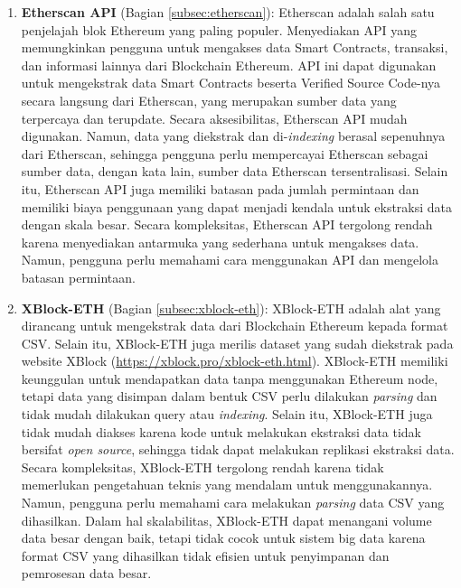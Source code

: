 \begin{enumerate}
	\item \textbf{Etherscan API} \parencite{etherscan2024} (Bagian \ref{subsec:etherscan}): Etherscan adalah salah satu penjelajah blok Ethereum yang paling populer. Menyediakan API yang memungkinkan pengguna untuk mengakses data Smart Contracts, transaksi, dan informasi lainnya dari Blockchain Ethereum. API ini dapat digunakan untuk mengekstrak data Smart Contracts beserta Verified Source Code-nya secara langsung dari Etherscan, yang merupakan sumber data yang terpercaya dan terupdate. Secara aksesibilitas, Etherscan API mudah digunakan. Namun, data yang diekstrak dan di-\textit{indexing} berasal sepenuhnya dari Etherscan, sehingga pengguna perlu mempercayai Etherscan sebagai sumber data, dengan kata lain, sumber data Etherscan tersentralisasi. Selain itu, Etherscan API juga memiliki batasan pada jumlah permintaan dan memiliki biaya penggunaan yang dapat menjadi kendala untuk ekstraksi data dengan skala besar. Secara kompleksitas, Etherscan API tergolong rendah karena menyediakan antarmuka yang sederhana untuk mengakses data. Namun, pengguna perlu memahami cara menggunakan API dan mengelola batasan permintaan.

	\item \textbf{XBlock-ETH} \parencite{zheng2020xblock} (Bagian \ref{subsec:xblock-eth}): XBlock-ETH adalah alat yang dirancang untuk mengekstrak data dari Blockchain Ethereum kepada format CSV. Selain itu, XBlock-ETH juga merilis dataset yang sudah diekstrak pada website XBlock (\url{https://xblock.pro/xblock-eth.html}). XBlock-ETH memiliki keunggulan untuk mendapatkan data tanpa menggunakan Ethereum node, tetapi data yang disimpan dalam bentuk CSV perlu dilakukan \textit{parsing} dan tidak mudah dilakukan query atau \textit{indexing}. Selain itu, XBlock-ETH juga tidak mudah diakses karena kode untuk melakukan ekstraksi data tidak bersifat \textit{open source}, sehingga tidak dapat melakukan replikasi ekstraksi data. Secara kompleksitas, XBlock-ETH tergolong rendah karena tidak memerlukan pengetahuan teknis yang mendalam untuk menggunakannya. Namun, pengguna perlu memahami cara melakukan \textit{parsing} data CSV yang dihasilkan. Dalam hal skalabilitas, XBlock-ETH dapat menangani volume data besar dengan baik, tetapi tidak cocok untuk sistem big data karena format CSV yang dihasilkan tidak efisien untuk penyimpanan dan pemrosesan data besar.


\end{enumerate}
